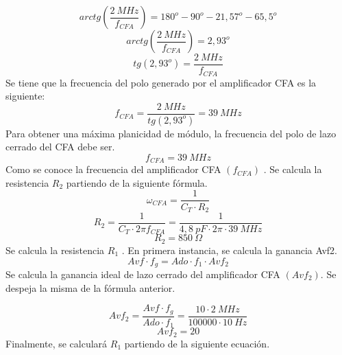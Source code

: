 \begin{equation}
    arctg\left(\frac{2~MHz}{f_{CFA}}\right) = 180^o - 90^o - 21,57^o - 65,5^o
\end{equation}
\begin{equation}
    arctg\left(\frac{2~MHz}{f_{CFA}}\right) = 2,93^o
\end{equation}
\begin{equation}
    tg (2,93^o) = \frac{2~MHz}{f_{CFA}}
\end{equation}
\bigskip
\hspace{1mm}Se tiene que la frecuencia del polo generado por el amplificador CFA es la siguiente:
\begin{equation}
    f_{CFA} = \frac{2~MHz}{tg (2,93^o)} = 39~MHz
\end{equation}
\bigskip
\hspace{1mm} Para obtener una máxima planicidad de módulo, la frecuencia del polo de lazo cerrado del CFA debe ser.
\begin{equation}
    \boxed{
        f_{CFA} = 39~MHz
    }
\end{equation}
\bigskip
\hspace{1mm} Como se conoce la frecuencia del amplificador CFA \((f_{CFA})\) . Se calcula la resistencia \( R_2 \) partiendo de la siguiente fórmula.
\begin{equation}
    \omega _{CFA} = \frac{1}{C_T \cdot R_2}
\end{equation}
\begin{equation}
    R_2 = \frac{1}{C_T \cdot 2\pi f_{CFA}} = \frac{1}{4,8~pF \cdot 2\pi \cdot 39~MHz}
\end{equation}
\begin{equation}
    \boxed{
        R_2 = 850~\Omega
    }
\end{equation}
\bigskip
\hspace{1mm} Se calcula la resistencia \( R_1 \) . En primera instancia, se calcula la ganancia Avf2.
\begin{equation}
    Avf \cdot f_g = Ado \cdot f_1 \cdot Avf_2
\end{equation}
\bigskip
\hspace{1mm} Se calcula la ganancia ideal de lazo cerrado del amplificador CFA \(( Avf_2)\). Se despeja la misma de la fórmula anterior.

\begin{equation}
    Avf_2 = \frac{Avf \cdot f_g}{Ado \cdot f_1} = \frac{10 \cdot 2~MHz}{100000 \cdot 10~Hz}
\end{equation}
\begin{equation}
    \boxed{
    Avf_2 = 20
    }
\end{equation}
\bigskip
\hspace{1mm} Finalmente, se calculará \( R_1 \) partiendo de la siguiente ecuación.

